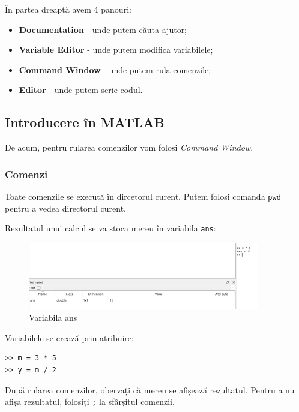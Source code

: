 \documentclass{exam}
\begin{document}
\par În partea dreaptă avem 4 panouri:

\begin{itemize}
	\item \textbf{Documentation} - unde putem căuta ajutor;
	\item \textbf{Variable Editor} - unde putem modifica variabilele;
	\item \textbf{Command Window} - unde putem rula comenzile;
	\item \textbf{Editor} - unde putem scrie codul.
\end{itemize}

\subsection{Introducere în MATLAB}

\par De acum, pentru rularea comenzilor vom folosi \textit{Command Window}.

\subsubsection{Comenzi}

\par Toate comenzile se execută în dircetorul curent. Putem folosi comanda \verb|pwd|
pentru a vedea directorul curent.

\newpage
\par Rezultatul unui calcul se va stoca mereu în variabila \verb|ans|:

\begin{figure}[ht]
	\centering
	\includegraphics[width=0.9\textwidth]{ans}
	\caption{Variabila ans}
\end{figure}

\par Variabilele se crează prin atribuire:

\begin{lstlisting}
>> m = 3 * 5
>> y = m / 2
\end{lstlisting}

\par După rularea comenzilor, obervați că mereu se afișează rezultatul. Pentru a
nu afișa rezultatul, folosiți \verb|;| la sfârșitul comenzii.
\end{document}
